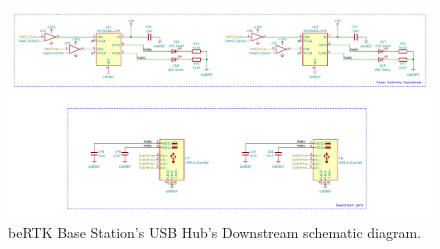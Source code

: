 \begin{figure}[h]
	\centering
	\includegraphics[width=1.0\textwidth]{Chapters/Figures/chapter3/USB_Hub_Downstream.pdf}
	\caption{beRTK\textsuperscript{\textregistered} Base Station's USB Hub's Downstream schematic diagram.}
	\label{fig:USB_Hub_Downstream_circuit}
\end{figure}






